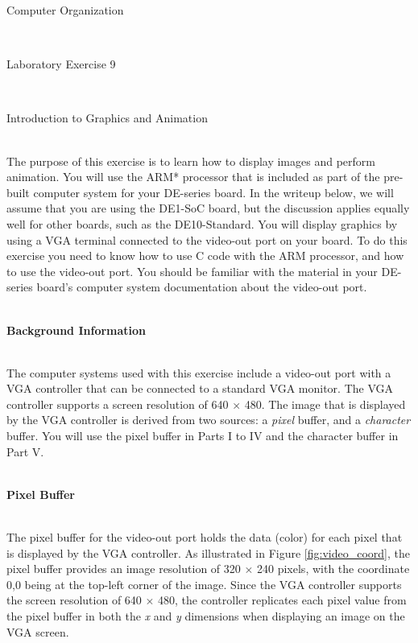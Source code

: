 \documentclass[epsfig,10pt,fullpage]{article}
\newcommand{\LabNum}{9}
\begin{document}
\centerline{\huge Computer Organization}
~\\
\centerline{\huge Laboratory Exercise \LabNum}
~\\
\centerline{\large Introduction to Graphics and Animation}
~\\

\noindent
The purpose of this exercise is to learn how to display images and perform animation. You will 
use the ARM* processor that is included as part of the pre-built computer system for your
DE-series board. In the writeup below, we will assume that you are using the DE1-SoC board, 
but the discussion applies equally well for other boards, such as the DE10-Standard. You
will display graphics by using a VGA terminal connected to the video-out port on your board. 
To do this exercise you need to know how to use C code with the ARM processor, and how to use 
the video-out port.  You should be familiar with the material in your DE-series board's computer 
system documentation about the video-out port.

~\\
\noindent
{\bf Background Information}

~\\
The computer systems used with this exercise include a video-out port with a VGA controller 
that can be connected to a standard VGA monitor. The VGA controller supports a screen resolution of
640 $\times$ 480. The image that is displayed by the VGA controller is
derived from two sources: a {\it pixel} buffer, and a {\it character} buffer. You will use
the pixel buffer in Parts I to IV and the character buffer in Part V.

~\\
\noindent
{\bf Pixel Buffer}
\label{sec:pixel_buffer}

~\\
\noindent
The pixel buffer for the video-out port holds the data (color) for each pixel that is 
displayed by the VGA controller.  As illustrated in Figure \ref{fig:video_coord}, the
pixel buffer provides an image resolution of 320 $\times$ 240 pixels, with the coordinate 
0,0 being at the top-left corner of the image. Since the VGA controller supports the screen 
resolution of 640 $\times$ 480, the controller replicates each pixel value from the pixel 
buffer in both the {\it x} and {\it y} dimensions when displaying an image on the VGA screen.
\end{document}

